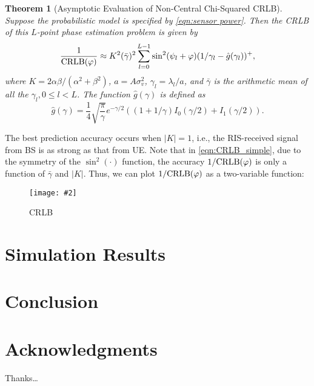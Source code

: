 \documentclass[12pt,draftclsnofoot,journal,onecolumn]{IEEEtran}
\newtheorem{theorem}{\bf Theorem}
\theoremstyle{nonumberplain}
\newcommand{\myincludegraphics}[2][width=12cm]{\texttt{[image: \#2]}}
\begin{document}
    
    \begin{theorem}[Asymptotic Evaluation of Non-Central Chi-Squared CRLB]
        Suppose the probabilistic model is specified by \eqref{eqn:sensor power}. Then the CRLB of this $L$-point phase estimation problem is given by 
        \begin{equation}
            \frac{1}{{\rm CRLB}(\varphi)}\approx K^2(\bar{\gamma})^2 \sum_{l=0}^{L-1}\sin^2(\psi_l+\varphi)(1/\gamma_l-\hat{g}(\gamma_l))^{+},
        \end{equation}
        where $K=2\alpha\beta/(\alpha^2+\beta^2)$, $a=A\sigma_v^2$, $\gamma_l=\lambda_l/a$, and $\bar{\gamma}$ is the arithmetic mean of all the $\gamma_l, 0\leq l<L$. The function $\hat{g}(\gamma)$ is defined as 
        \begin{equation}
            \hat{g}(\gamma) = \frac{1}{4} \sqrt{\frac{\pi}{\gamma}}e^{-\gamma/2}\left((1+1/\gamma)I_0(\gamma/2) + I_1(\gamma/2)\right).
            \label{eqn:definition g function}
        \end{equation}
    \end{theorem}

   The best prediction accuracy occurs when $\lvert K \rvert = 1$, i.e., the RIS-received signal from BS is as strong as that from UE. Note that in \eqref{eqn:CRLB_simple}, due to the symmetry of the $\sin^2(\cdot)$ function, the accuracy $1/{\rm CRLB}(\varphi)$ is only a function of $\bar{\gamma}$ and $\lvert K \rvert$. Thus, we can plot $1/{\rm CRLB}(\varphi)$ as a two-variable function:
    \begin{figure}[!h]
        \centering
        \myincludegraphics{figures/crlb.pdf}
        \caption{CRLB}
    \end{figure}

\section{Simulation Results}
\label{Simulation Results}


\section{Conclusion}
\label{Conclusion}



\appendices


\section*{Acknowledgments}
Thanks\dots 
\end{document}
